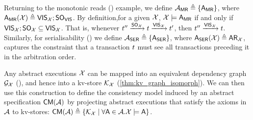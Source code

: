 Returning to the monotonic reads (\MR) example, 
we define $\mathcal{A}_{\mathsf{MR}} \triangleq \{\mathsf{A}_{\mathsf{MR}}\}$, where $\mathsf{A}_{\mathsf{MR}}(\mathcal{X}) \triangleq \mathsf{VIS}_{\mathcal{X}} ; \mathsf{SO}_{\mathsf{VIS}}$. 
By definition,for a given $\mathcal{X}$, $\mathcal{X} \models \mathsf{A}_{\mathsf{MR}}$ if and only 
if $\mathsf{VIS}_{\mathcal{X}} ; \mathsf{SO}_{\mathcal{X}} \subseteq \mathsf{VIS}_{\mathcal{X}}$. 
That is, whenever $t'' \xrightarrow{\mathsf{SO}_{\mathcal{X}}} t \xrightarrow{\mathsf{VIS}_{\mathcal{X}}} t'$, 
then $t'' \xrightarrow{\mathsf{VIS}_{\mathcal{X}}} t$.
Similarly, for serialisability (\SER) we define $\mathcal{A}_{\mathsf{SER}} \triangleq \{ \mathsf{A}_{\mathsf{SER}} \}$, where $\mathsf{A}_{\mathsf{SER}}(\mathcal{X}) \triangleq \mathsf{AR}_{\mathcal{X}}$, 
captures the constraint that a transaction $t$ must see all transactions
preceding it in the arbitration order.

Any abstract executions $\mathcal{X}$ can be mapped 
into an equivalent dependency graph $\mathcal{G}_{\mathcal{X}}$ (\citet{laws}), and hence into a kv-store 
$\mathcal{K}_{\mathcal{X}}$ (\cref{thm:kv_graph_isomorph}). 
We can then use this construction to define the consistency model induced by an abstract specification 
$\CMs(\Ax)$ by projecting abstract executions that satisfy the axioms in $\mathcal{A}$ to kv-stores: 
$\CMs(\Ax) \defeq \{ \hh_{\aexec} \mid \forall \A \in \Ax. \aexec \models \A \}$. 

